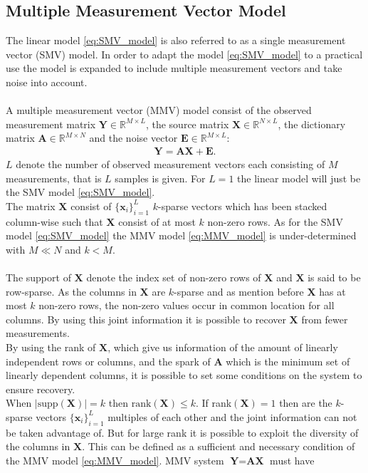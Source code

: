 \subsection{Multiple Measurement Vector Model}\label{sec:MMV}
The linear model \eqref{eq:SMV_model} is also referred to as a single measurement vector (SMV) model. In order to adapt the model \eqref{eq:SMV_model} to a practical use the model is expanded to include multiple measurement vectors and take noise into account.
\\ \\
A multiple measurement vector (MMV) model consist of the observed measurement matrix $\mathbf{Y} \in \mathbb{R}^{M \times L}$, the source matrix $\mathbf{X} \in \mathbb{R}^{N \times L}$, the dictionary matrix $\mathbf{A} \in \mathbb{R}^{M \times N}$ and the noise vector $\textbf{E} \in \mathbb{R}^{M \times L}$:
\begin{align}\label{eq:MMV_model}
\mathbf{Y} = \mathbf{AX}+\textbf{E}.
\end{align}
$L$ denote the number of observed measurement vectors each consisting of $M$ measurements, that is $L$ samples is given. For $L = 1$ the linear model will just be the SMV model \eqref{eq:SMV_model}. 
\\
The matrix $\mathbf{X}$ consist of $\lbrace \mathbf{x}_i \rbrace_{i=1}^L$ $k$-sparse vectors which has been stacked column-wise such that $\mathbf{X}$ consist of at most $k$ non-zero rows. As for the SMV model \eqref{eq:SMV_model} the MMV model \eqref{eq:MMV_model} is under-determined with $M \ll N$ and $k < M$\cite[p. 42]{CS}.
\\ \\
The support of $\mathbf{X}$ denote the index set of non-zero rows of $\mathbf{X}$ and $\mathbf{X}$ is said to be row-sparse. As the columns in $\mathbf{X}$ are $k$-sparse and as mention before $\mathbf{X}$ has at most $k$ non-zero rows, the non-zero values occur in common location for all columns. By using this joint information it is possible to recover $\mathbf{X}$ from fewer measurements.
\\
By using the rank of $\mathbf{X}$, which give us information of the amount of linearly independent rows or columns, and the spark of $\mathbf{A}$ which is the minimum set of linearly dependent columns, it is possible to set some conditions on the system to ensure recovery.
\\
When $\vert \text{supp}(\mathbf{X})\vert = k$ then $\text{rank}(\mathbf{X}) \leq k$. If rank$(\mathbf{X}) = 1$ then are the $k$-sparse vectors $\lbrace \mathbf{x}_i \rbrace_{i=1}^L$ multiples of each other and the joint information can not be taken advantage of. But for large rank it is possible to exploit the diversity of the columns in $\mathbf{X}$. This can be defined as a sufficient and necessary condition of the MMV model \eqref{eq:MMV_model}. MMV system $\textbf{Y}=\textbf{AX}$ must have
